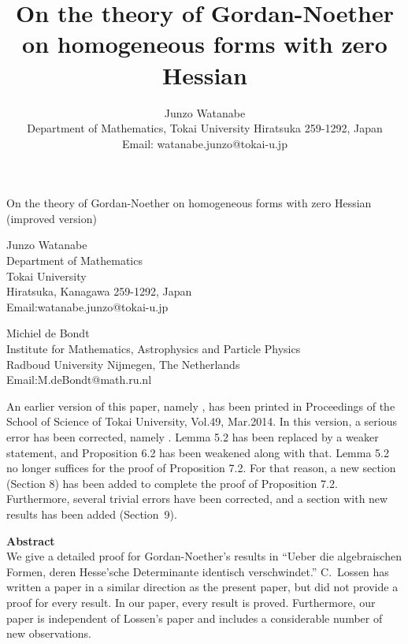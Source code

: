 \documentclass[12pt]{article}
\title{
On the theory of Gordan-Noether  \\  on  homogeneous forms with zero Hessian }
\author{
Junzo Watanabe  \\ 
Department of Mathematics, Tokai University 
Hiratsuka 259-1292, Japan \\
Email: watanabe.junzo@tokai-u.jp
}
\theoremstyle{definition}
\theoremstyle{remark}
\begin{document}

\def\vs{\vspace{1ex}}

\begin{center}
{\Large  On the theory of Gordan-Noether on homogeneous forms with zero Hessian (improved version)} 
\end{center}

\begin{center}
{Junzo Watanabe}\\ 
{Department of Mathematics}\\ 
{Tokai University} \\  {Hiratsuka, Kanagawa 259-1292, Japan}\\ 
 {Email:watanabe.junzo@tokai-u.jp}\\ 

\vspace{1ex}
\end{center}

\begin{center}
{Michiel de Bondt}\\ 
{Institute for Mathematics, Astrophysics and Particle Physics}\\ 
{Radboud University Nijmegen, The Netherlands}\\ 
 {Email:M.deBondt@math.ru.nl}\\ 

\vspace{1ex}
\end{center}

An earlier version of this paper, namely \cite{watanabe_2},  has been printed in Proceedings of the School of Science of Tokai University, 
Vol.\@ 49, Mar.\@ 2014. %
In this version, a 
serious error has been corrected, namely \cite[Lemma~5.2]{watanabe_2}. Lemma 5.2 has been replaced by a weaker
statement, and Proposition 6.2 has been weakened along with that. Lemma 5.2 no longer suffices
for the proof of Proposition 7.2. For that reason, a new section (Section 8) has been added
to complete the proof of Proposition 7.2. Furthermore, several trivial errors have been
corrected, and a section with new results has been added (Section~9).  

\begin{center}
 {\bf Abstract}\\ 
{We give a detailed  proof for Gordan-Noether's results  in  
``Ueber die algebraischen  Formen, deren Hesse'sche Determinante identisch verschwindet.''
C.\ Lossen has written a paper in a similar direction as the present paper, but did not provide
a proof for every result. In our paper, every result is proved. Furthermore,
our paper is independent of Lossen's paper and 
includes a considerable number of new observations.} 

\vspace{1ex}
\end{center}
\end{document}
